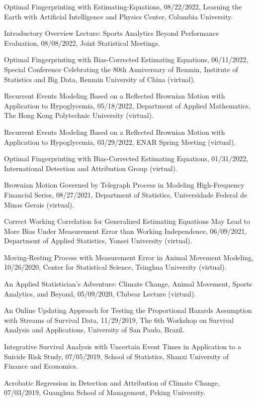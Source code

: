 \documentclass[Statistics]{vita}
\begin{document}
\begin{vita}
\begin{InvitedTalks}
  \item Optimal Fingerprinting with Estimating-Equations, 08/22/2022, Learning the Earth with Artificial Intelligence and Physics Center, Columbia University.
  \item Introductory Overview Lecture: Sports Analytics Beyond Performance Evaluation, 08/08/2022, Joint Statistical Meetings.
  \item Optimal Fingerprinting with Bias-Corrected Estimating Equations, 06/11/2022, Special Conference Celebrating the 80th Anniversary of Renmin, Institute of Statistics and Big Data, Renmin University of China (virtual).
  \item Recurrent Events Modeling Based on a Reflected Brownian Motion with Application to Hypoglycemia, 05/18/2022, Department of Applied Mathematics, The Hong Kong Polytechnic University (virtual).
  \item Recurrent Events Modeling Based on a Reflected Brownian Motion with Application to Hypoglycemia, 03/29/2022, ENAR Spring Meeting (virtual).
  \item Optimal Fingerprinting with Bias-Corrected Estimating Equations, 01/31/2022, International Detection and Attribution Group (virtual).
  \item Brownian Motion Governed by Telegraph Process in Modeling High-Frequency Financial Series, 08/27/2021, Department of Statistics, Universidade Federal de Minas Gerais (virtual).
  \item Correct Working Correlation for Generalized Estimating Equations May Lead to More Bias Under Measurement Error than Working Independence, 06/09/2021, Department of Applied Statistics, Yonsei University (virtual).
  \item Moving-Resting Process with Measurement Error in Animal Movement Modeling, 10/26/2020, Center for Statistical Science, Tsinghua University (virtual).
  \item An Applied Statistician's Adventure: Climate Change, Animal Movement, Sports Analytics, and Beyond, 05/09/2020, Clubear Lecture (virtual).
  \item An Online Updating Approach for Testing the Proportional Hazards Assumption with Streams of Survival Data, 11/29/2019, The 6th Workshop on Survival Analysis and Applications, University of San Paulo, Brazil.
  \item Integrative Survival Analysis with Uncertain Event Times in Application to a Suicide Risk Study, 07/05/2019, School of Statistics, Shanxi University of Finance and Economics.
  \item Acrobatic Regression in Detection and Attribution of Climate Change, 07/03/2019, Guanghua School of Management, Peking University.

\end{InvitedTalks}
\end{vita}
\end{document}
